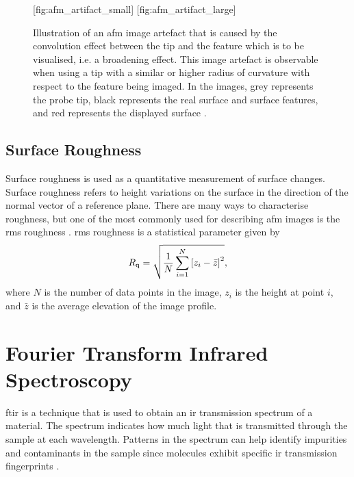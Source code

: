 \begin{figure}[htbp]
    \centering
    [fig:afm_artifact_small]
    \hfill
    [fig:afm_artifact_large]
    \caption[Illustration of the convolution effect in an \ac{afm} image due to tip size.]{Illustration of an \ac{afm} image artefact that is caused by the convolution effect between the tip and the feature which is to be visualised, i.e. a broadening effect. This image artefact is observable when using a tip with  a similar or  higher radius of curvature with respect to the feature being imaged. In the images, grey represents the probe tip, black represents the real surface and surface features, and red represents the displayed surface \citep[Adapted from][]{psia2002xe100}.}
    \label{fig:afm_tip-convolution}
\end{figure}

\subsection{Surface Roughness}

Surface roughness is used as a quantitative measurement of surface changes. Surface roughness refers to height variations on the surface in the direction of the normal vector of a reference plane. There are many ways to characterise roughness, but one of the most commonly used for describing \ac{afm} images is the \ac{rms} roughness \citep{eaton2010atomic}. \Ac{rms} roughness is a statistical parameter given by \citep{thomas1999amplitude}
\begin{equation}\label{eq:rmsroughness}
R_\textrm{q} = \sqrt{\frac{1}{N}\sum_{i=1}^{N}\left[ z_i-\bar{z} \right]^2},
\end{equation}
where $N$ is the number of data points in the image, $z_i$ is the height at point $i$, and $\bar{z}$ is the average elevation of the image profile. %

\section{Fourier Transform Infrared Spectroscopy}\label{sec:ftir}
\Acf{ftir} is a technique that is used to obtain an \ac{ir} transmission spectrum of a material. The spectrum indicates how much light that is transmitted through the sample at each wavelength. Patterns in the spectrum can help identify impurities and contaminants in the sample since molecules exhibit specific \ac{ir} transmission fingerprints \citep{smith2011fourier}.

